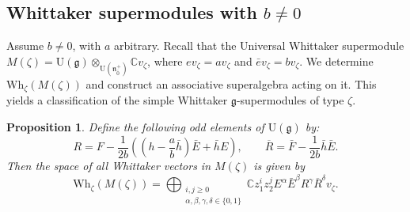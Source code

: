 \documentclass[a4paper,10pt]{article}
\theoremstyle{definition}
\theoremstyle{plain}
\newtheorem{proposition}[definition]{Proposition}
\theoremstyle{remark}
\theoremstyle{mystyle}
\numberwithin{equation}{section}
\begin{document}
\subsection{Whittaker supermodules with $b\neq 0$}\label{s33}
Assume $b\neq 0$, with $a$ arbitrary. Recall that the Universal Whittaker supermodule $M(\zeta)=\mathrm U(\mathfrak g)\otimes _{\mathrm U(\mathfrak n^+_{\bar 0})}\mathbb Cv_{\zeta}$, where $ev_{\zeta} = av_{\zeta}$ and $\bar ev_{\zeta} = bv_{\zeta}$. We determine \(\mathrm{Wh}_{\zeta}(M(\zeta))\) and construct an associative superalgebra acting on it. This yields a classification of the simple Whittaker $\mathfrak g$-supermodules of type \(\zeta\). 
\begin{proposition}\label{Mp}
    Define the following odd elements of $\mathrm U(\mathfrak g)$ by: 
    $$
    R=F-\frac{1}{2b}((h-\frac{a}{b}\bar h)\bar E+\bar hE),\qquad \overline{R}=\bar F-\frac{1}{2b}\bar h\bar E.
    $$ 
    Then the space of all Whittaker vectors in \(M(\zeta)\) is given by
    $$
    \mathrm{Wh}_{\zeta}(M(\zeta))=\bigoplus_{\substack{i,j\geq 0\\\alpha ,\beta ,\gamma,\delta\in \{0,1\}}}\mathbb Cz_1^iz_2^jE^{\alpha}\bar E^{\beta}R^{\gamma}\overline{R}^{\delta}v_{\zeta}.
    $$
\end{proposition}
\end{document}
